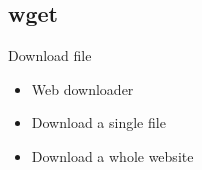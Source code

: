 \subsection{wget}

\begin{frame}[fragile]{Download file}
  \begin{itemize}
    \pause \item Web downloader
    \pause \item Download a single file
    \pause \item Download a whole website
  \end{itemize}
\end{frame}
